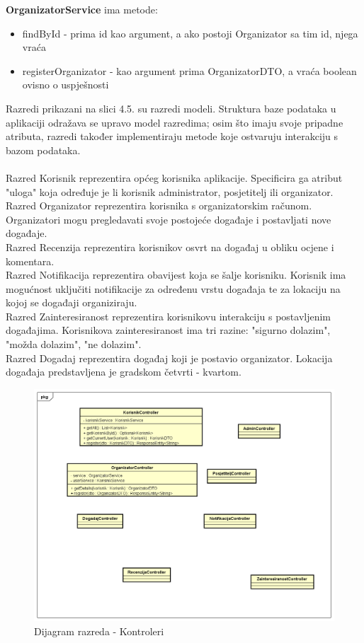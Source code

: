 			\textbf{OrganizatorService} ima metode: 
			\begin{itemize}
				\item findById - prima id kao argument, a ako postoji Organizator sa tim id, njega vraća
				\item registerOrganizator - kao argument prima OrganizatorDTO, a vraća boolean ovisno o uspješnosti
			\end{itemize}
			\eject
			Razredi prikazani na slici 4.5. su razredi modeli. Struktura baze podataka u aplikaciji odražava se upravo model razredima; osim što imaju svoje pripadne atributa, razredi također implementiraju metode koje ostvaruju interakciju s bazom podataka. \\ 
			\\ Razred Korisnik reprezentira općeg korisnika aplikacije. Specificira ga atribut "uloga" koja određuje je li korisnik administrator, posjetitelj ili organizator.
			\\ Razred Organizator reprezentira korisnika s organizatorskim računom. Organizatori mogu pregledavati svoje postojeće događaje i postavljati nove događaje.
			\\ Razred Recenzija reprezentira korisnikov osvrt na događaj u obliku ocjene i komentara.
			\\ Razred Notifikacija reprezentira obavijest koja se šalje korisniku. Korisnik ima mogućnost uključiti notifikacije za određenu vrstu događaja te za lokaciju na kojoj se događaji organiziraju.
			\\ Razred Zainteresiranost reprezentira korisnikovu interakciju s postavljenim događajima. Korisnikova zainteresiranost ima tri razine: "sigurno dolazim", "možda dolazim", "ne dolazim".
			\\ Razred Dogadaj reprezentira događaj koji je postavio organizator. Lokacija događaja predstavljena je gradskom četvrti - kvartom.
			
			\pagebreak
			
			\begin{figure}[H]
				\includegraphics[scale=0.55]{dijagramiKlasa/Dijagram razreda - Kontroleri.png} %
				\centering
				\caption{Dijagram razreda - Kontroleri}
				\label{fig:promjene}
			\end{figure}
			
